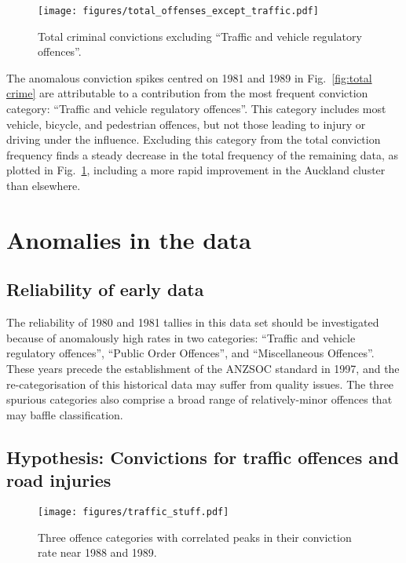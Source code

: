 \documentclass[onecolumn]{myarticle}
\begin{document}
\begin{figure}
  \centering
  \texttt{[image: figures/total\_offenses\_except\_traffic.pdf]}
  \caption{Total criminal convictions excluding ``Traffic and vehicle regulatory offences''.}
  \label{fig:total crime excluding traffic}
\end{figure}

The anomalous conviction spikes centred on 1981 and 1989 in Fig.~\ref{fig:total crime} are attributable to a contribution from the most frequent conviction category: ``Traffic and vehicle regulatory offences''.
This category includes most vehicle, bicycle, and pedestrian offences, but not those leading to injury or driving under the influence.
Excluding this category from the total conviction frequency finds a steady decrease in the total frequency of the remaining data, as plotted in Fig.~\ref{fig:total crime excluding traffic}, including a more rapid improvement in the Auckland cluster than elsewhere. 

\section*{Anomalies in the data}

\subsection*{Reliability of early data}

The reliability of 1980 and 1981 tallies in this data set should be investigated because of anomalously high rates in two categories: ``Traffic and vehicle regulatory offences'', ``Public Order Offences'', and ``Miscellaneous Offences''.
These years precede the establishment of the ANZSOC standard in 1997, and the re-categorisation of this historical data may suffer from quality issues. 
The three spurious categories also comprise a broad range of relatively-minor offences that may baffle classification.

\subsection*{Hypothesis: Convictions for traffic offences and road injuries}

\begin{figure}
  \centering
  \texttt{[image: figures/traffic\_stuff.pdf]}
  \caption{Three offence categories with correlated peaks in their conviction rate near 1988 and 1989.}
  \label{fig:traffic stuff}
\end{figure}
\end{document}
